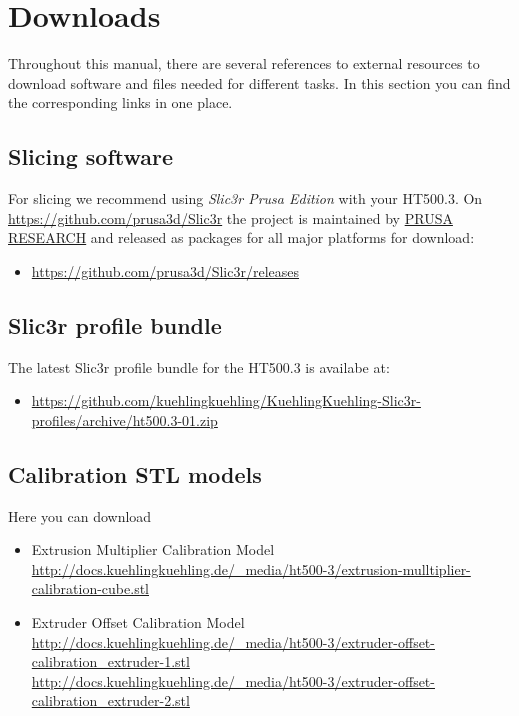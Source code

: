 \section{Downloads} \label{sec:downloads}

Throughout this manual, there are several references to external
resources to download software and files needed for different tasks. In this
section you can find the corresponding links in one place.

\subsection{Slicing software}

For slicing we recommend using \emph{Slic3r Prusa Edition} with your HT500.3. 
On \url{https://github.com/prusa3d/Slic3r} the project is maintained by
\href{http://prusa3d.com/}{PRUSA RESEARCH} and released as packages for 
all major platforms for download: 

\begin{itemize}
  \item \url{https://github.com/prusa3d/Slic3r/releases}
\end{itemize}


\subsection{Slic3r profile bundle}

The latest Slic3r profile bundle for the HT500.3 is availabe at:

\begin{itemize}
  \item \url{https://github.com/kuehlingkuehling/KuehlingKuehling-Slic3r-profiles/archive/ht500.3-01.zip}
\end{itemize}  

\subsection{Calibration STL models}

Here you can download 

\begin{itemize}
  \item Extrusion Multiplier Calibration Model\\
        \url{http://docs.kuehlingkuehling.de/_media/ht500-3/extrusion-mulltiplier-calibration-cube.stl}
  \item Extruder Offset Calibration Model\\
        \url{http://docs.kuehlingkuehling.de/_media/ht500-3/extruder-offset-calibration_extruder-1.stl}\\
        \url{http://docs.kuehlingkuehling.de/_media/ht500-3/extruder-offset-calibration_extruder-2.stl}
\end{itemize}
